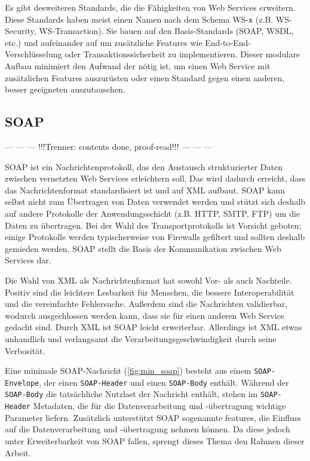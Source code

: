 \documentclass[runningheads]{llncs}
\newcommand{\germanquote}[1]{\glqq{}#1\grqq{}}
\begin{document}
    Es gibt desweiteren Standards, die die Fähigkeiten von Web Services erweitern. Diese Standards
    haben meist einen Namen nach dem Schema \germanquote{WS-\texttt{x}} (z.B. WS-Security,
    WS-Transaction). Sie bauen auf den Basis-Standards (SOAP, WSDL, etc.) und aufeinander auf um
    zusätzliche Features wie End-to-End-Verschlüsselung oder Transaktionssicherheit zu
    implementieren. Dieser modulare Aufbau minimiert den Aufwand der nötig ist, um einen Web
    Service mit zusätzlichen Features auszurüsten oder einen Standard gegen einen anderen, besser
    geeigneten auszutauschen.

  \label{soap}
  \subsection{SOAP}
  \nocite{wfm_site}
  \nocite{wk_soap}
   \begin{center}--- --- --- !!!Trenner: contents done, proof-read!!! --- --- ---\end{center}

    SOAP ist ein Nachrichtenprotokoll, das den Austausch strukturierter Daten zwischen vernetzten Web Services erleichtern soll. Das wird dadurch erreicht, dass das Nachrichtenformat standardisiert ist und auf XML aufbaut. SOAP kann selbst nicht zum Übertragen von Daten verwendet werden und stützt sich deshalb auf andere Protokolle der Anwendungsschicht (z.B. HTTP, SMTP, FTP) um die Daten zu übertragen. Bei der Wahl des Transportprotokolls ist Vorsicht geboten; einige Protokolle werden typischerweise von Firewalls gefiltert und sollten deshalb gemieden werden. SOAP stellt die Basis der Kommunikation zwischen Web Services dar.

    Die Wahl von XML als Nachrichtenformat hat sowohl Vor- als auch Nachteile. Positiv sind die leichtere Lesbarkeit für Menschen, die bessere Interoperabilität und die vereinfachte Fehlersuche. Außerdem sind die Nachrichten validierbar, wodurch ausgechlossen werden kann, dass sie für einen anderen Web Service gedacht sind. Durch XML ist SOAP leicht erweiterbar. Allerdings ist XML etwas unhandlich und verlangsamt die Verarbeitungsgeschwindigkeit durch seine Verbosität.

    Eine minimale SOAP-Nachricht (\ref{fig:min_soap}) besteht aus einem \texttt{SOAP-Envelope}, der einen \texttt{SOAP-Header} und einen \texttt{SOAP-Body} enthält. Während der \texttt{SOAP-Body} die tatsächliche Nutzlast der Nachricht enthält, stehen im \texttt{SOAP-Header} Metadaten, die für die Datenverarbeitung und -übertragung wichtige Parameter liefern. Zusätzlich unterstützt SOAP sogenannte \germanquote{features}, die Einfluss auf die Datenverarbeitung und -übertragung nehmen können. Da diese jedoch unter \germanquote{Erweiterbarkeit von SOAP} fallen, sprengt dieses Thema den Rahmen dieser Arbeit.
\end{document}
